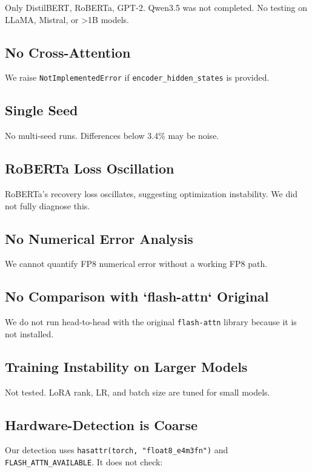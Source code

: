 Only DistilBERT, RoBERTa, GPT-2. Qwen3.5 was not completed. No testing on 
LLaMA, Mistral, or >1B models.

\subsection{No Cross-Attention}

We raise \texttt{NotImplementedError} if \texttt{encoder\_hidden\_states} is provided.

\subsection{Single Seed}

No multi-seed runs. Differences below 3.4\% may be noise.

\subsection{RoBERTa Loss Oscillation}

RoBERTa's recovery loss oscillates, suggesting optimization instability. 
We did not fully diagnose this.

\subsection{No Numerical Error Analysis}

We cannot quantify FP8 numerical error without a working FP8 path.

\subsection{No Comparison with `flash-attn` Original}

We do not run head-to-head with the original \texttt{flash-attn} library because 
it is not installed.

\subsection{Training Instability on Larger Models}

Not tested. LoRA rank, LR, and batch size are tuned for small models.

\subsection{Hardware-Detection is Coarse}

Our detection uses \texttt{hasattr(torch, "float8\_e4m3fn")} and 
\texttt{FLASH\_ATTN\_AVAILABLE}. It does not check:

